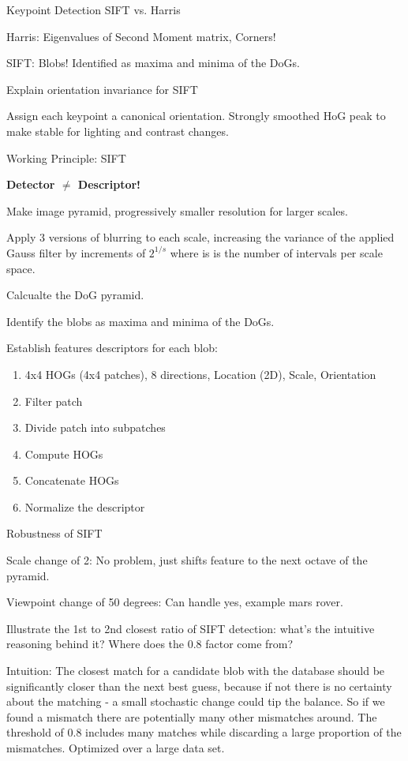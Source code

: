 \documentclass[10pt,a4paper]{scrartcl}
\begin{document}
\begin{multicols*}{2}
\begin{QandA}
{Keypoint Detection SIFT vs. Harris}
\item Harris: Eigenvalues of Second Moment matrix, Corners!
\item SIFT: Blobs! Identified as maxima and minima of the DoGs.
\end{QandA}

\begin{QandA}
{Explain orientation invariance for SIFT}
\item Assign each keypoint a canonical orientation. Strongly smoothed HoG peak to make stable for lighting and contrast changes.
\end{QandA}

\begin{QandA}
{Working Principle: SIFT}
\item \textbf{Detector $\neq$ Descriptor!}
\item Make image pyramid, progressively smaller resolution for larger scales.
\item Apply 3 versions of blurring to each scale, increasing the variance of the applied Gauss filter by increments of $2^{1/s}$ where is is the number of intervals per scale space.
\item Calcualte the DoG pyramid.
\item Identify the blobs as maxima and minima of the DoGs.
\item Establish features descriptors for each blob:
\begin{enumerate}
\item 4x4 HOGs (4x4 patches), 8 directions, Location (2D), Scale, Orientation
\item Filter patch
\item Divide patch into subpatches
\item Compute HOGs
\item Concatenate HOGs
\item Normalize the descriptor
\end{enumerate}
\end{QandA}   

\begin{QandA}
{Robustness of SIFT}
\item Scale change of 2: No problem, just shifts feature to the next octave of the pyramid.
\item Viewpoint change of 50 degrees: Can handle yes, example mars rover.
\end{QandA} 

\begin{QandA}
{Illustrate the 1st to 2nd closest ratio of SIFT detection: what’s the intuitive
reasoning behind it? Where does the 0.8 factor come from?}
\item Intuition: The closest match for a candidate blob with the database should be significantly closer than the next best guess, because if not there is no certainty about the matching - a small stochastic change could tip the balance. So if we found a mismatch there are potentially many other mismatches around. The threshold of 0.8 includes many matches while discarding a large proportion of the mismatches. Optimized over a large data set.
\end{QandA}


\end{multicols*}
\end{document}
